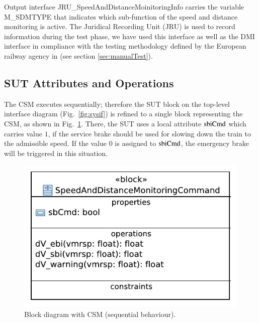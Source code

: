 Output interface {\sf JRU\_SpeedAndDistanceMoinitoringInfo} carries
the variable {\sf M\_SDMTYPE} that indicates which sub-function of the
speed and distance monitoring is active. 
The Juridical Recording Unit (JRU) is  used to record information
during the test phase, we have used this
interface as well as the DMI interface in compliance  with the testing
methodology defined by the European railway agency in \cite{ETCS-Subset076} (see section
\ref{sec:manualTest}).




\subsection{SUT Attributes and Operations}
The CSM executes sequentially; therefore 
the SUT block on the top-level interface diagram (Fig.~\ref{fig:sysif})  is refined 
to a single block representing the CSM,   as shown in Fig.~\ref{fig:sutcomposite}.
There, the SUT uses a local attribute $\text{sbiCmd}$ which 
carries value $1$, if the service
brake should be used for slowing down the train to the admissible
speed. If the value $0$ is assigned to 
$\text{sbiCmd}$, the emergency brake will be triggered in this situation.

\begin{figure}
\centering
\includegraphics[]{CSM-SystemUnderTest.pdf}
\caption{Block diagram with CSM (sequential behaviour).}
 \label{fig:sutcomposite}
 \end{figure}


 
 
